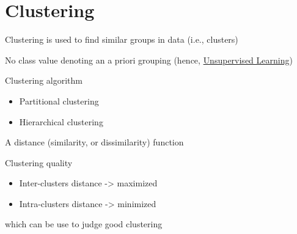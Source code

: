 \documentclass[
]{book}
\providecommand{\tightlist}{%
  \setlength{\itemsep}{0pt}\setlength{\parskip}{0pt}}
\begin{document}
\hypertarget{clustering}{%
\section{Clustering}\label{clustering}}

Clustering is used to find similar groups in data (i.e., clusters)

No class value denoting an a priori grouping (hence, \protect\hyperlink{unsupervised-learning}{Unsupervised Learning})

Clustering algorithm

\begin{itemize}
\tightlist
\item
  Partitional clustering\\
\item
  Hierarchical clustering
\end{itemize}

A distance (similarity, or dissimilarity) function

Clustering quality

\begin{itemize}
\tightlist
\item
  Inter-clusters distance -\textgreater{} maximized\\
\item
  Intra-clusters distance -\textgreater{} minimized
\end{itemize}

which can be use to judge good clustering
\end{document}
